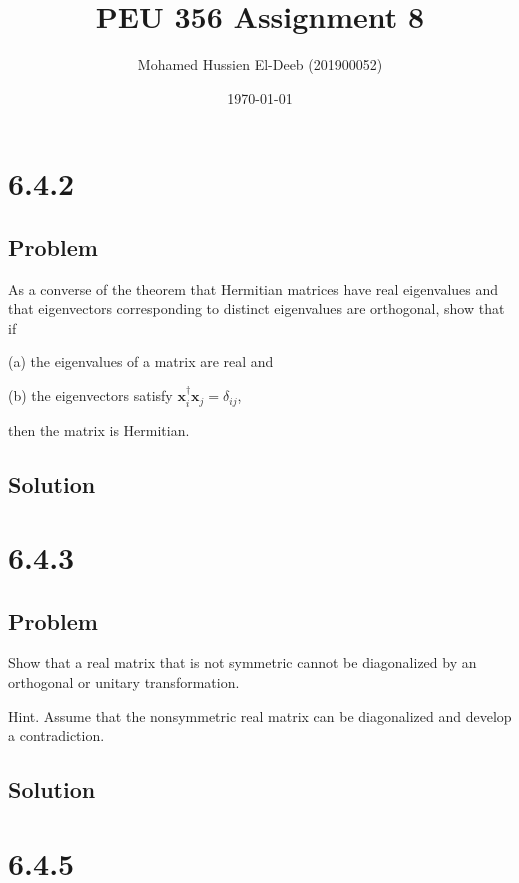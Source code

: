 \documentclass[12pt]{article}
\title{PEU 356 Assignment 8}
\author{Mohamed Hussien El-Deeb (201900052)}
\date{\today}
\begin{document}
\maketitle
\tableofcontents
\hypersetup{linkcolor=RoyalBlue4}

\newpage
\section{6.4.2}

\subsection{Problem}

As a converse of the theorem that Hermitian matrices have real eigenvalues and that eigenvectors corresponding to distinct eigenvalues are orthogonal, show that if

(a) the eigenvalues of a matrix are real and

(b) the eigenvectors satisfy \(\mathbf{x}_i^{\dagger} \mathbf{x}_j=\delta_{i j}\),

then the matrix is Hermitian.

\subsection{Solution}

\newpage
\section{6.4.3}

\subsection{Problem}

Show that a real matrix that is not symmetric cannot be diagonalized by an orthogonal or unitary transformation.

Hint. Assume that the nonsymmetric real matrix can be diagonalized and develop a contradiction.

\subsection{Solution}

\newpage
\section{6.4.5}
\end{document}
